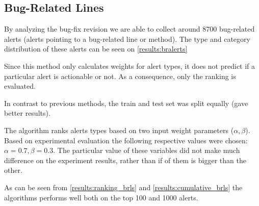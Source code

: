 \subsection{Bug-Related Lines}

By analyzing the bug-fix revision we are able to collect around 8700 bug-related alerts (alerts pointing to a bug-related line or method). The type and category distribution of these alerts can be seen on \cref{results:bralerts}

Since this method only calculates weights for alert types, it does not predict if a particular alert is actionable or not. As a consequence, only the ranking is evaluated.

In contrast to previous methods, the train and test set was split equally (gave better results).

The algorithm ranks alerts types based on two input weight parameters ($\alpha,\beta$). Based on experimental evaluation the following respective values were chosen: $\alpha=0.7, 
\beta=0.3$. The particular value of these variables did not make much difference on the experiment results, rather than if of them is bigger than the other.

As can be seen from \cref{results:ranking_brls} and \cref{results:cumulative_brls} the algorithms performs well both on the top 100 and 1000 alerts.

